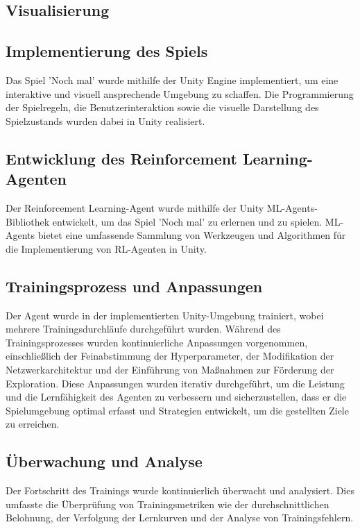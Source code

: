\subsection{Visualisierung}
\subsection{Implementierung des Spiels}

Das Spiel 'Noch mal' wurde mithilfe der Unity Engine implementiert, um eine interaktive und visuell ansprechende Umgebung zu schaffen. Die Programmierung der Spielregeln, die Benutzerinteraktion sowie die visuelle Darstellung des Spielzustands wurden dabei in Unity realisiert.

\subsection{Entwicklung des Reinforcement Learning-Agenten}

Der Reinforcement Learning-Agent wurde mithilfe der Unity ML-Agents-Bibliothek entwickelt, um das Spiel 'Noch mal' zu erlernen und zu spielen. ML-Agents bietet eine umfassende Sammlung von Werkzeugen und Algorithmen für die Implementierung von RL-Agenten in Unity.

\subsection{Trainingsprozess und Anpassungen}

Der Agent wurde in der implementierten Unity-Umgebung trainiert, wobei mehrere Trainingsdurchläufe durchgeführt wurden. Während des Trainingsprozesses wurden kontinuierliche Anpassungen vorgenommen, einschließlich der Feinabstimmung der Hyperparameter, der Modifikation der Netzwerkarchitektur und der Einführung von Maßnahmen zur Förderung der Exploration. Diese Anpassungen wurden iterativ durchgeführt, um die Leistung und die Lernfähigkeit des Agenten zu verbessern und sicherzustellen, dass er die Spielumgebung optimal erfasst und Strategien entwickelt, um die gestellten Ziele zu erreichen.

\subsection{Überwachung und Analyse}

Der Fortschritt des Trainings wurde kontinuierlich überwacht und analysiert. Dies umfasste die Überprüfung von Trainingsmetriken wie der durchschnittlichen Belohnung, der Verfolgung der Lernkurven und der Analyse von Trainingsfehlern.

